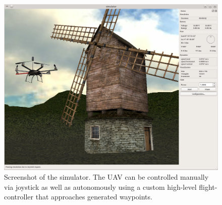 \begin{figure}
  \centering
  \includegraphics[width=1.0\textwidth]{simulator}
  \caption{Screenshot of the simulator. The UAV can be controlled manually via joystick as well as autonomously using a custom high-level flight-controller that approaches generated waypoints.}
  \label{figure_simulator}
\end{figure}


\newpage\thispagestyle{empty}
